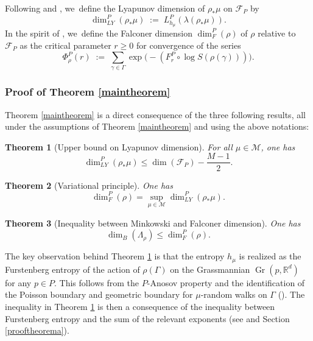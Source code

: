 \documentclass[10pt]{amsart}
\newtheorem{theorem}{Theorem}[section]
\newcommand{\R}{\mathbb{R}}
\newcommand{\F}{\mathcal{F}}
\newcommand{\M}{\mathcal M}
\let\G\Gamma
\DeclareMathOperator{\Gr}{Gr}
\begin{document}
Following \cite{DO80} and \cite{KY79}, we~define the Lyapunov dimension of \(\rho_*\mu\) on \(\F_P\) by
\begin{equation}\label{dimlyap:definition}\dim_{LY}^P(\rho_*\mu) \; := \; L_{h_\mu}^P (\lambda(\rho_*\mu)). \end{equation}
In the spirit of \cite{Fal88}, we~define the Falconer dimension \(\dim_F^P(\rho)\) of \(\rho\) relative to~\(\F_P\) as the critical parameter \(r \ge 0\) for convergence of the series
\begin{equation}\label{falconerseries} \Phi_\rho^P (r) \; := \; \sum_{\gamma \in \Gamma} \exp \bigl(-(F_r^P\circ\log S(\rho(\gamma)))\bigr).\end{equation}

\subsubsection{Proof of Theorem \ref{maintheorem}}

Theorem \ref{maintheorem} is a direct consequence of the three following results, all under the assumptions of Theorem \ref{maintheorem} and using the above notations:

\begin{theorem}[Upper bound on Lyapunov dimension]\label{theorema}
For all \(\mu \in \M\), one has
\[
\dim_{LY}^P(\rho_*\mu) \le \dim(\F_P) - \frac{M - 1}{2}.
\]
\end{theorem}

\begin{theorem}[Variational principle]\label{theoremb}
One has \begin{equation} \label{Lyapunov} \dim_F^P(\rho) = \sup_{\mu \in \M}\dim_{LY}^P(\rho_*\mu).\end{equation}
\end{theorem}

\begin{theorem}[Inequality between Minkowski and Falconer dimension]\label{theoremc}
One has
\[
\dim_B(\Lambda_\rho) \le \dim_F^P(\rho).
\]
\end{theorem}

The key observation behind Theorem \ref{theorema} is that the entropy \(h_\mu\) is realized as the Furstenberg entropy of the action of \(\rho (\G)\) on the Grassmannian \(\Gr(p,\R^d)\) for any \(p \in P\). This follows from the \(P\)-Anosov property and the identification of the Poisson boundary and geometric boundary for \(\mu\)-random walks on \(\Gamma\) (\cite{Kai00}). The inequality in Theorem \ref{theorema} is then a consequence of the inequality between Furstenberg entropy and the sum of the relevant exponents (see \cite{LL23} and Section \ref{prooftheorema}).
\end{document}
